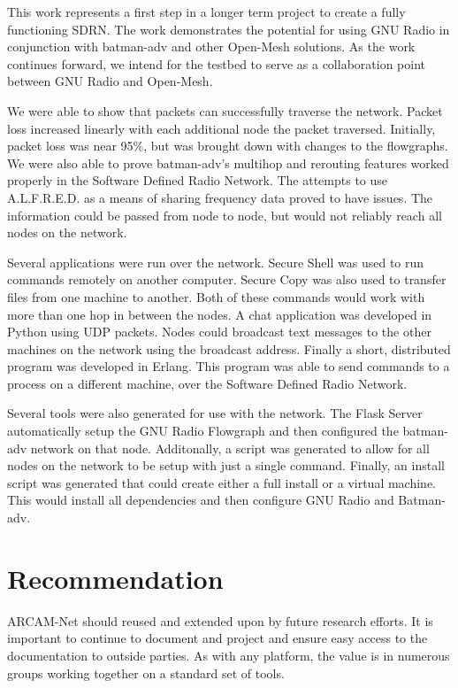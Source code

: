 This work represents a first step in a longer term project to create a fully functioning SDRN. The work demonstrates the potential for using GNU Radio in conjunction with batman-adv and other Open-Mesh solutions. As the work continues forward, we intend for the testbed to serve as a collaboration point between GNU Radio and Open-Mesh. 

We were able to show that packets can successfully traverse the network. Packet loss increased linearly with each additional node the packet traversed. Initially, packet loss was near 95\%, but was brought down with changes to the flowgraphs. We were also able to prove batman-adv's multihop and rerouting features worked properly in the Software Defined Radio Network. The attempts to use A.L.F.R.E.D. as a means of sharing frequency data proved to have issues. The information could be passed from node to node, but would not reliably reach all nodes on the network. 

Several applications were run over the network. Secure Shell was used to run commands remotely on another computer. Secure Copy was also used to transfer files from one machine to another. Both of these commands would work with more than one hop in between the nodes. A chat application was developed in Python using UDP packets. Nodes could broadcast text messages to the other machines on the network using the broadcast address. Finally a short, distributed program was developed in Erlang. This program was able to send commands to a process on a different machine, over the Software Defined Radio Network. 

Several tools were also generated for use with the network. The Flask Server automatically setup the GNU Radio Flowgraph and then configured the batman-adv network on that node. Additonally, a script was generated to allow for all nodes on the network to be setup with just a single command. Finally, an install script was generated that could create either a full install or a virtual machine. This would install all dependencies and then configure GNU Radio and Batman-adv. 




\section{Recommendation}

ARCAM-Net should reused and extended upon by future research efforts. It is important to continue to document and project and ensure easy access to the documentation to outside parties. As with any platform, the value is in numerous groups working together on a standard set of tools. 

